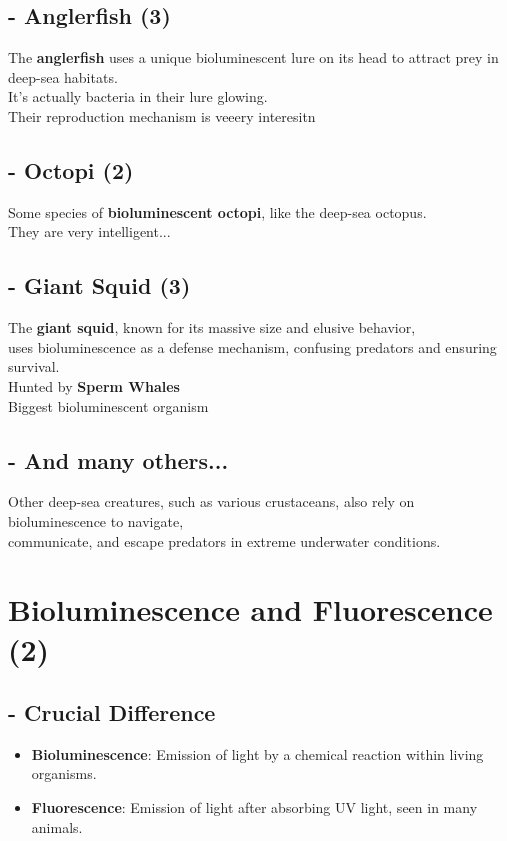 \documentclass{article}
\begin{document}
\subsection*{- Anglerfish (3)}
The \textbf{anglerfish} uses a unique bioluminescent lure on its head to attract prey in deep-sea habitats.\\
It's actually bacteria in their lure glowing.\\
Their reproduction mechanism is veeery interesitn

\subsection*{- Octopi (2)}
Some species of \textbf{bioluminescent octopi}, like the deep-sea octopus.\\
They are very intelligent...

\subsection*{- Giant Squid (3)}
The \textbf{giant squid}, known for its massive size and elusive behavior, \\
uses bioluminescence as a defense mechanism, confusing predators and ensuring survival.\\
Hunted by \textbf{Sperm Whales}\\
Biggest bioluminescent organism

\subsection*{- And many others... }
Other deep-sea creatures, such as various crustaceans, also rely on bioluminescence to navigate,\\
communicate, and escape predators in extreme underwater conditions.


\section*{Bioluminescence and Fluorescence (2)}

\subsection*{- Crucial Difference }
\begin{itemize}
 \item\textbf{Bioluminescence}: Emission of light by a chemical reaction within living organisms.
 \item\textbf{Fluorescence}: Emission of light after absorbing UV light, seen in many animals.
\end{itemize}
  
\end{document}
